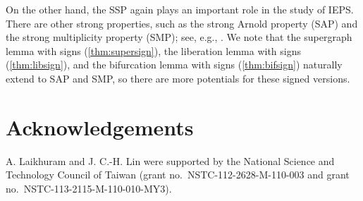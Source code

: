 \documentclass{article}
\theoremstyle{definition}
\begin{document}
On the other hand, the SSP again plays an important role in the study of IEPS.  There are other strong properties, such as the strong Arnold property (SAP) and the strong multiplicity property (SMP); see, e.g., \cite{gSAP,IEPG2,IEPGZF22}.  We note that the supergraph lemma with signs (\cref{thm:supersign}), the liberation lemma with signs (\cref{thm:libsign}), and the bifurcation lemma with signs (\cref{thm:bifsign}) naturally extend to SAP and SMP, so there are more potentials for these signed versions.

\section*{Acknowledgements}
A. Laikhuram and J. C.-H. Lin were supported by the National Science and Technology Council of Taiwan (grant no.\ NSTC-112-2628-M-110-003 and grant no.\ NSTC-113-2115-M-110-010-MY3).

% 
\end{document}
